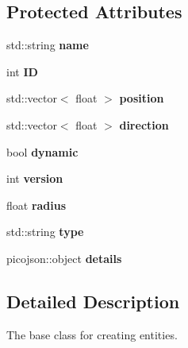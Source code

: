 \subsection*{Protected Attributes}
\begin{DoxyCompactItemize}
\item 
\mbox{\label{classcsci3081_1_1EntityBase_ac38853fd49f990fbf4a5253f6a629830}} 
std\+::string {\bfseries name}
\item 
\mbox{\label{classcsci3081_1_1EntityBase_aac37ea7e640a8a710b3b5ac1f8c721ab}} 
int {\bfseries ID}
\item 
\mbox{\label{classcsci3081_1_1EntityBase_aab57c1d92706e8a78b85a159df6955e9}} 
std\+::vector$<$ float $>$ {\bfseries position}
\item 
\mbox{\label{classcsci3081_1_1EntityBase_a76a2b78baa728973a7e3e4608224840e}} 
std\+::vector$<$ float $>$ {\bfseries direction}
\item 
\mbox{\label{classcsci3081_1_1EntityBase_ad4623718110440313bf7ee316838a352}} 
bool {\bfseries dynamic}
\item 
\mbox{\label{classcsci3081_1_1EntityBase_ae4224835873699684a7b7a1ea39fdf77}} 
int {\bfseries version}
\item 
\mbox{\label{classcsci3081_1_1EntityBase_ae2c7b177b5038a5a369046ae577ef19e}} 
float {\bfseries radius}
\item 
\mbox{\label{classcsci3081_1_1EntityBase_aed45722b1b5a3b0f191084139d47c051}} 
std\+::string {\bfseries type}
\item 
\mbox{\label{classcsci3081_1_1EntityBase_a75477f89357da1cc9ac999ec6bd6db5b}} 
picojson\+::object {\bfseries details}
\end{DoxyCompactItemize}


\subsection{Detailed Description}
The base class for creating entities. 

